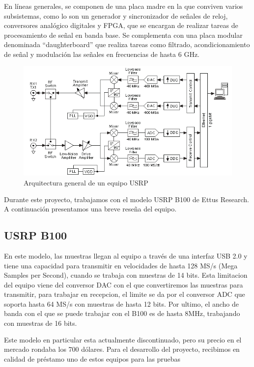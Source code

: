 En líneas generales, se componen de una placa madre en la que conviven varios subsistemas, como lo son un generador y sincronizador de señales de reloj, conversores analógico digitales y \gls{FPGA}, que se encargan de realizar tareas de procesamiento de señal en banda base. Se complementa con una placa modular denominada “daughterboard” que realiza tareas como filtrado, acondicionamiento de señal y modulación las señales en frecuencias de hasta 6 GHz.

\begin{figure}[h!]
	\centering
	\includegraphics[scale=0.55]{figuras/cap04/usrp_arq}
	\caption{\label{f:usrp_arq} Arquitectura general de un equipo USRP\cite{USRP_arch}}
\end{figure}

Durante este proyecto, trabajamos con el modelo USRP B100 de Ettus Research. A continuación presentamos una breve reseña del equipo.

\subsection{USRP B100}

En este modelo, las muestras llegan al equipo a través de una interfaz USB 2.0 y tiene una capacidad para transmitir en velocidades de hasta 128 MS/s (Mega Samples per Second), cuando se trabaja con muestras de 14 bits. Esta limitacion del equipo viene del conversor DAC con el que convertiremos las muestras para transmitir, para trabajar en recepcion, el limite se da por el conversor \gls{ADC} que soporta hasta 64 MS/s con muestras de hasta 12 bits. Por ultimo, el ancho de banda con el que se puede trabajar con el B100 es de hasta 8MHz, trabajando con muestras de 16 bits.\cite{b100}  

Este modelo en particular esta actualmente discontinuado, pero su precio en el mercado rondaba los 700 dólares. Para el desarrollo del proyecto, recibimos en calidad de préstamo uno de estos equipos para las pruebas

